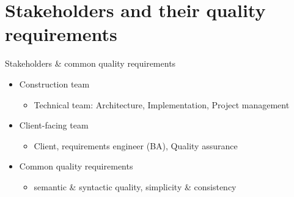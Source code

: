 \section{Stakeholders and their quality requirements}

\begin{frame}{Stakeholders \& common quality requirements}                      
  \begin{itemize} 
    \item<+-| alert@+> Construction team
      \begin{itemize}
	\item Technical team: Architecture, Implementation, Project management
      \end{itemize}
    \item<+-| alert@+> Client-facing team
      \begin{itemize}
	\item Client, requirements engineer (BA), Quality assurance
      \end{itemize}
    \item<+-| alert@+> Common quality requirements
      \begin{itemize}
	\item<+-| alert@+> semantic \& syntactic quality, simplicity \& consistency
      \end{itemize}
  \end{itemize}
\end{frame}


